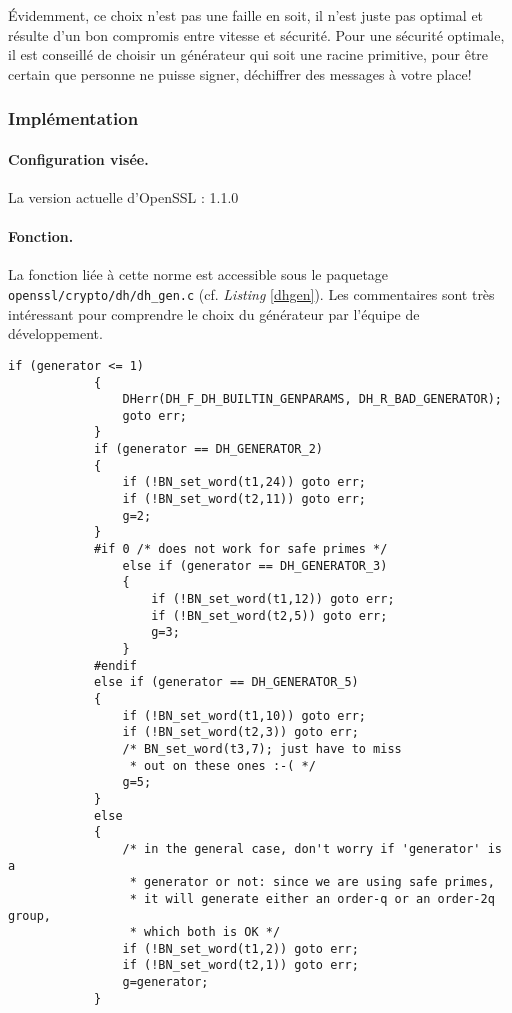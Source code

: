 		Évidemment, ce choix n'est pas une faille en soit, il n'est juste pas optimal et résulte d'un bon compromis entre vitesse et sécurité. Pour une sécurité optimale, il est conseillé de choisir un générateur qui soit une racine primitive, pour être certain que personne ne puisse signer, déchiffrer des messages à votre place!\\
	
	
		\subsubsection{Implémentation}
		
		\paragraph{Configuration visée.\\}

		La version actuelle d'OpenSSL : 1.1.0
		
		\paragraph{Fonction.\\}
		La fonction liée à cette norme est accessible sous le paquetage \texttt{openssl/crypto/dh/dh\_gen.c} (cf. \textit{Listing} \ref{dhgen}). Les commentaires sont très intéressant pour comprendre le choix du générateur par l'équipe de développement.
		
		
		\begin{lstlisting}[style=customc,caption=dh\_gen.c, label=dhgen]
			if (generator <= 1)
			{
				DHerr(DH_F_DH_BUILTIN_GENPARAMS, DH_R_BAD_GENERATOR);
				goto err;
			}
			if (generator == DH_GENERATOR_2)
			{
				if (!BN_set_word(t1,24)) goto err;
				if (!BN_set_word(t2,11)) goto err;
				g=2;
			}
			#if 0 /* does not work for safe primes */
				else if (generator == DH_GENERATOR_3)
				{
					if (!BN_set_word(t1,12)) goto err;
					if (!BN_set_word(t2,5)) goto err;
					g=3;
				}
			#endif
			else if (generator == DH_GENERATOR_5)
			{
				if (!BN_set_word(t1,10)) goto err;
				if (!BN_set_word(t2,3)) goto err;
				/* BN_set_word(t3,7); just have to miss
				 * out on these ones :-( */
				g=5;
			}
			else
			{
				/* in the general case, don't worry if 'generator' is a
				 * generator or not: since we are using safe primes,
				 * it will generate either an order-q or an order-2q group,
				 * which both is OK */
				if (!BN_set_word(t1,2)) goto err;
				if (!BN_set_word(t2,1)) goto err;
				g=generator;
			}
		\end{lstlisting}
		
